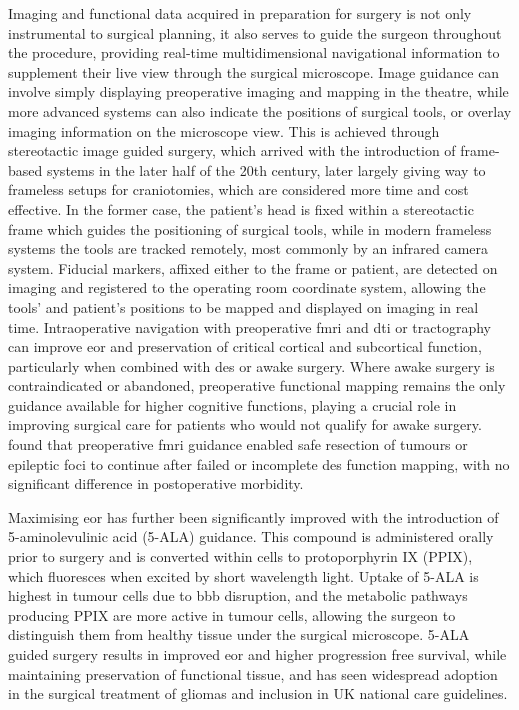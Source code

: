 Imaging and functional data acquired in preparation for surgery is not only instrumental to surgical planning, it also serves to guide the surgeon throughout the procedure, providing real-time multidimensional navigational information to supplement their live view through the surgical microscope.
Image guidance can involve simply displaying preoperative imaging and mapping in the theatre, while more advanced systems can also indicate the positions of surgical tools, or overlay imaging information on the microscope view.
This is achieved through stereotactic image guided surgery, which arrived with the introduction of frame-based systems in the later half of the 20th century, later largely giving way to frameless setups for craniotomies\autocite{Sandeman1995}, which are considered more time and cost effective\autocite{Sattur2019}.
In the former case, the patient's head is fixed within a stereotactic frame which guides the positioning of surgical tools, while in modern frameless systems the tools are tracked remotely, most commonly by an infrared camera system\autocite{Sattur2019}.
Fiducial markers, affixed either to the frame or patient, are detected on imaging and registered to the operating room coordinate system, allowing the tools' and patient's positions to be mapped and displayed on imaging in real time.
Intraoperative navigation with preoperative \gls{fmri} and \gls{dti} or tractography can improve \gls{eor} and preservation of critical cortical and subcortical function\autocite{Wu2007,Bello2008,Bello2010d}, particularly when combined with \gls{des} or awake surgery\autocite{Aibar-Duran2020}.
Where awake surgery is contraindicated or abandoned, preoperative functional mapping remains the only guidance available for higher cognitive functions, playing a crucial role in improving surgical care for patients who would not qualify for awake surgery.
\textcite{Rigolo2020a} found that preoperative \gls{fmri} guidance enabled safe resection of tumours or epileptic foci to continue after failed or incomplete \gls{des} function mapping, with no significant difference in postoperative morbidity.

Maximising \gls{eor} has further been significantly improved with the introduction of 5-aminolevulinic acid (5-ALA) guidance.
This compound is administered orally prior to surgery and is converted within cells to protoporphyrin IX (PPIX), which fluoresces when excited by short wavelength light.
Uptake of 5-ALA is highest in tumour cells due to \gls{bbb} disruption, and the metabolic pathways producing PPIX are more active in tumour cells, allowing the surgeon to distinguish them from healthy tissue under the surgical microscope.
5-ALA guided surgery results in improved \gls{eor} and higher progression free survival, while maintaining preservation of functional tissue\autocite{Coburger2019,Golub2020}, and has seen widespread adoption in the surgical treatment of gliomas\autocite{Stummer2006} and inclusion in UK national care guidelines\autocite{NICE2021}.

